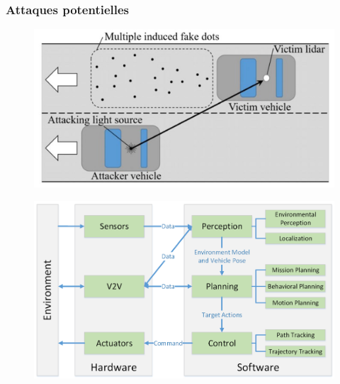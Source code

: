 \documentclass{beamer}
\begin{document}
\begin{frame}
  \frametitle{Attaques potentielles}
  
\begin{description}\setlength{\itemsep}{1.5mm}
\item[Attaque par aveuglement des capteurs]

\begin{figure}
\includegraphics[scale=0.2,right]{img/blinding.png}
\end{figure}

\item[Attaque par modification]

\begin{figure}
\flushright
\includegraphics[scale=0.3,right]{img/data_flow.png}
\end{figure}

\end{description}

\end{frame}
\end{document}
